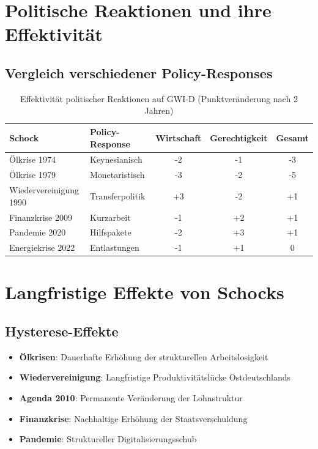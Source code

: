 \section{Politische Reaktionen und ihre Effektivität}

\subsection{Vergleich verschiedener Policy-Responses}

\begin{table}[ht]
\centering
\begin{tabular}{llccc}
\toprule
\textbf{Schock} & \textbf{Policy-Response} & \textbf{Wirtschaft} & \textbf{Gerechtigkeit} & \textbf{Gesamt} \\
\midrule
Ölkrise 1974 & Keynesianisch & -2 & -1 & -3 \\
Ölkrise 1979 & Monetaristisch & -3 & -2 & -5 \\
Wiedervereinigung 1990 & Transferpolitik & +3 & -2 & +1 \\
Finanzkrise 2009 & Kurzarbeit & -1 & +2 & +1 \\
Pandemie 2020 & Hilfspakete & -2 & +3 & +1 \\
Energiekrise 2022 & Entlastungen & -1 & +1 & 0 \\
\bottomrule
\end{tabular}
\caption{Effektivität politischer Reaktionen auf GWI-D (Punktveränderung nach 2 Jahren)}
\label{tab:policy-effectiveness}
\end{table}

\section{Langfristige Effekte von Schocks}

\subsection{Hysterese-Effekte}

\begin{itemize}
\item \textbf{Ölkrisen}: Dauerhafte Erhöhung der strukturellen Arbeitslosigkeit
\item \textbf{Wiedervereinigung}: Langfristige Produktivitätslücke Ostdeutschlands
\item \textbf{Agenda 2010}: Permanente Veränderung der Lohnstruktur
\item \textbf{Finanzkrise}: Nachhaltige Erhöhung der Staatsverschuldung
\item \textbf{Pandemie}: Struktureller Digitalisierungsschub
\end{itemize}

